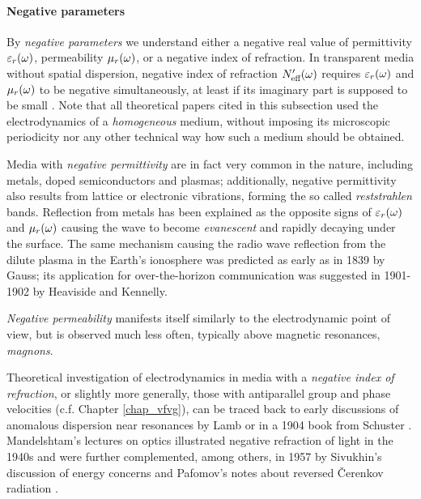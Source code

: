 \paragraph{Negative parameters}%
By \textit{negative parameters} we  understand either a negative real value of permittivity $\varepsilon_r(\omega)$, permeability $\mu_r(\omega)$, 
or a negative index of refraction. In transparent media without spatial dispersion, negative index of refraction $N_{\text{eff} }'(\omega)$ requires $\varepsilon_r(\omega)$ and $\mu_r(\omega)$ to be negative simultaneously, at least if its imaginary part is supposed to be small \cite{pazoutova2011dp}.  %
Note that all theoretical papers cited in this subsection used the electrodynamics of a \textit{homogeneous} medium, without imposing its microscopic periodicity nor any other technical way how such a medium should be obtained. 

Media with \textit{negative permittivity} are in fact very common in the nature, including metals, doped semiconductors and plasmas; additionally, negative permittivity also results from lattice or electronic vibrations, forming the so called \textit{reststrahlen} bands. Reflection from metals has been explained  %
as the opposite signs of $\varepsilon_r(\omega)$ and $\mu_r(\omega)$ causing the wave to become \textit{evanescent} and rapidly decaying under the surface. %
The same mechanism causing the radio wave reflection from the dilute plasma in the Earth's ionosphere was predicted as early as in 1839 by Gauss; its application for over-the-horizon communication was suggested in 1901-1902 by Heaviside and Kennelly.

\textit{Negative permeability} manifests itself similarly to the electrodynamic point of view, but is observed much less often, typically above magnetic resonances, \textit{magnons}.

Theoretical investigation of electrodynamics in media with a \textit{negative index of refraction}, or slightly more generally, those with antiparallel group and phase velocities (c.f. Chapter \ref{chap_vfvg}), can be traced back \cite{agranovich2006spatial} to early discussions of anomalous dispersion near resonances by Lamb or in a 1904 book from Schuster \cite{schuster1904introduction, boardman2005negative}. Mandelshtam's lectures on optics illustrated negative refraction of light in the 1940s \cite{mandelstam1971lectures} and were further complemented, among others, in 1957 by Sivukhin's discussion of energy concerns \cite{sivukhin1957energy} and Pafomov's notes about reversed \v{C}erenkov radiation \cite{pafomov1956cerenkov}. 

